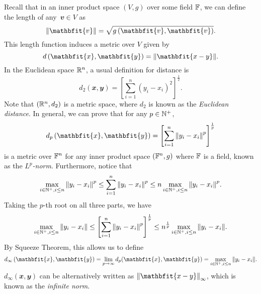 \documentclass[math, code]{amznotes}
\theoremstyle{remark}
\begin{document}
Recall that in an inner product space $\left(V, g\right)$ over some field $\mathbb{F}$, we can define the length of any~$\mathbfit{v} \in V$ as 
\begin{equation*}
    \norm{\mathbfit{v}} = \sqrt{g\left(\mathbfit{v}, \mathbfit{v}\right)}.
\end{equation*}
This length function induces a metric over $V$ given by 
\begin{equation*}
    d\left(\mathbfit{x}, \mathbfit{y}\right) = \norm{\mathbfit{x - y}}.
\end{equation*}
In the Euclidean space $\mathbb{R}^n$, a usual definition for distance is
\begin{equation*}
    d_2\left(\mathbfit{x}, \mathbfit{y}\right) = \left[\sum_{i = 1}^{n}\left(y_i - x_i\right)^2\right]^{\frac{1}{2}}.
\end{equation*}
Note that $\left(\mathbb{R}^n, d_2\right)$ is a metric space, where $d_2$ is known as the \textit{Euclidean distance}. In general, we can prove that for any $p \in \mathbb{N}^+$,
\begin{equation*}
    d_p\left(\mathbfit{x}, \mathbfit{y}\right) = \left[\sum_{i = 1}^{n}\norm{y_i - x_i}^p\right]^{\frac{1}{p}}
\end{equation*}
is a metric over $\mathbb{F}^n$ for any inner product space $\left(\mathbb{F}^n, g\right)$ where $\mathbb{F}$ is a field, known as the $L^p$\textit{-norm}. Furthermore, notice that
\begin{equation*}
    \max_{i \in \mathbb{N}^+, i \leq n}{\left\lVert {y_i - x_i} \right\rVert}^p \leq \sum_{i = 1}^{n}{\left\lVert {y_i - x_i} \right\rVert}^p \leq n\max_{i \in \mathbb{N}^+, i \leq n}{\left\lVert {y_i - x_i} \right\rVert}^p.
\end{equation*}
Taking the $p$-th root on all three parts, we have
\begin{equation*}
    \max_{i \in \mathbb{N}^+, i \leq n}{\left\lVert {y_i - x_i} \right\rVert} \leq \left[\sum_{i = 1}^{n}{\left\lVert {y_i - x_i} \right\rVert}^p\right]^{\frac{1}{p}} \leq n^{\frac{1}{p}}\max_{i \in \mathbb{N}^+, i \leq n}{\left\lVert {y_i - x_i} \right\rVert}.
\end{equation*}
By Squeeze Theorem, this allows us to define
\begin{equation*}
    d_\infty\left(\mathbfit{x}, \mathbfit{y}\right) = \lim_{p \to \infty}d_p(\mathbfit{x}, \mathbfit{y}) = \max_{i \in \N^+, i \leq n}\norm{y_i - x_i}.
\end{equation*}
$d_\infty\left(\mathbfit{x}, \mathbfit{y}\right)$ can be alternatively written as $\norm{\mathbfit{x - y}}_\infty$, which is known as the \textit{infinite norm}.
\end{document}
